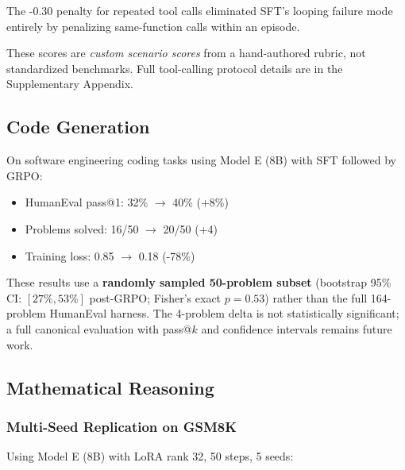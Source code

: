 \documentclass{article}
\begin{document}
The -0.30 penalty for repeated tool calls eliminated SFT's looping failure mode entirely by penalizing same-function calls within an episode.

These scores are \emph{custom scenario scores} from a hand-authored rubric, not standardized benchmarks. Full tool-calling protocol details are in the Supplementary Appendix.

\subsection{Code Generation}

On software engineering coding tasks using Model E (8B) with SFT followed by GRPO:

\begin{itemize}
    \item HumanEval pass@1: 32\% $\rightarrow$ 40\% (+8\%)
    \item Problems solved: 16/50 $\rightarrow$ 20/50 (+4)
    \item Training loss: 0.85 $\rightarrow$ 0.18 (-78\%)
\end{itemize}

These results use a \textbf{randomly sampled 50-problem subset} (bootstrap 95\% CI: $[27\%, 53\%]$ post-GRPO; Fisher's exact $p{=}0.53$) rather than the full 164-problem HumanEval harness. The 4-problem delta is not statistically significant; a full canonical evaluation with pass@$k$ and confidence intervals remains future work.

\subsection{Mathematical Reasoning}

\subsubsection{Multi-Seed Replication on GSM8K}

Using Model E (8B) with LoRA rank 32, 50 steps, 5 seeds:
\end{document}
